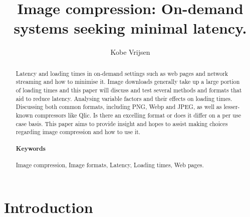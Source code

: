 \documentclass[11pt,a4paper]{report}
\title{Image compression: On-demand systems seeking minimal latency.}
\author{Kobe Vrijsen}
\begin{document}

\maketitle

\begin{abstract}

Latency and loading times in on-demand settings such as web pages and network streaming and how to minimise it. Image downloads generally take up a large portion of loading times and this paper will discuss and test several methods and formats that aid to reduce latency. Analysing variable factors and their effects on loading times. Discussing both common formats, including PNG, Webp and JPEG, as well as lesser-known compressors like Qlic. Is there an excelling format or does it differ on a per use case basis. This paper aims to provide insight and hopes to assist making choices regarding image compression and how to use it.

\begin{center}
    \item \paragraph{Keywords} Image compression, Image formats, Latency, Loading times, Web pages.
\end{center}
\end{abstract}


\newpage

\tableofcontents


\newpage
{}

\chapter{Introduction}

\end{document}
